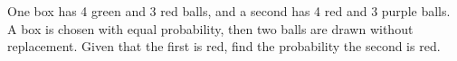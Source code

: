 One box has 4 green and 3 red balls, and a second has 4 red and 3 purple balls. A box is chosen with equal probability, then two balls are drawn without replacement. Given that the first is red, find the probability the second is red.
